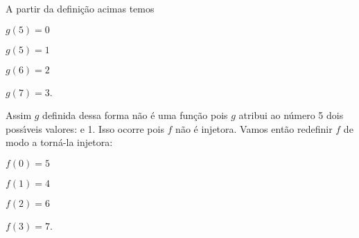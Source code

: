 \documentclass{beamer}
\begin{document}
    \begin{frame}
        A partir da defini\c{c}\~ao acimas temos\pause
        \begin{center}
            $g(5) = 0 $\pause\\

            \vspace{.3cm}
            
            $g(5) = 1$\pause\\
            
            \vspace{.3cm}

            $g(6) = 2$\pause\\

            \vspace{.3cm}
            
            $g(7) = 3$.\pause
        \end{center}

        Assim $g$ definida dessa forma \pause n\~ao \'e uma fun\c{c}\~ao \pause pois $g$ atribui ao n\'umero 5 \pause dois poss{\'\i}veis valores:  e 1. \pause Isso ocorre pois $f$ n\~ao \'e injetora. \pause Vamos ent\~ao redefinir $f$ de modo a torn\'a-la injetora:\pause
        \begin{center}
            $f(0) = 5$\pause\\

            \vspace{.3cm}

            $f(1) = 4$\pause\\

            \vspace{.3cm}

            $f(2) = 6$\pause\\

            \vspace{.3cm}

            $f(3) = 7$.\pause
        \end{center}
    \end{frame}
\end{document}
